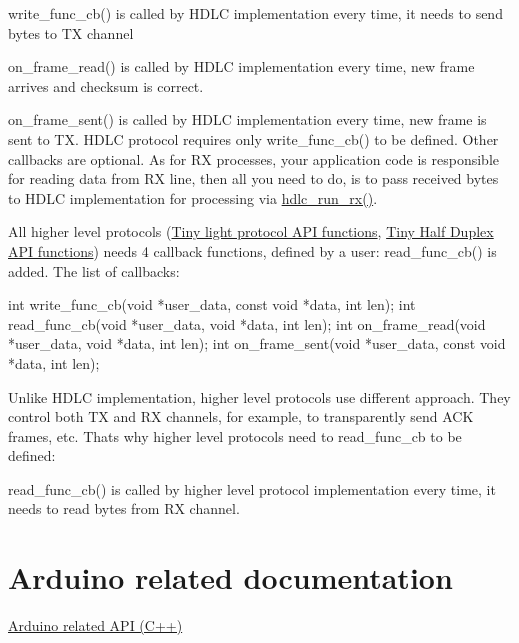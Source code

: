 \begin{DoxyItemize}
\item write\+\_\+func\+\_\+cb() is called by H\+D\+LC implementation every time, it needs to send bytes to TX channel
\item on\+\_\+frame\+\_\+read() is called by H\+D\+LC implementation every time, new frame arrives and checksum is correct.
\item on\+\_\+frame\+\_\+sent() is called by H\+D\+LC implementation every time, new frame is sent to TX. H\+D\+LC protocol requires only write\+\_\+func\+\_\+cb() to be defined. Other callbacks are optional. As for RX processes, your application code is responsible for reading data from RX line, then all you need to do, is to pass received bytes to H\+D\+LC implementation for processing via \hyperlink{group__HDLC__API_ga2d6e77ad3ac6ee53499afaa68cb69f72}{hdlc\+\_\+run\+\_\+rx()}.
\end{DoxyItemize}

All higher level protocols (\hyperlink{group__LIGHT__API}{Tiny light protocol A\+PI functions}, \hyperlink{group__HALF__DUPLEX__API}{Tiny Half Duplex A\+PI functions}) needs 4 callback functions, defined by a user\+: read\+\_\+func\+\_\+cb() is added. The list of callbacks\+:


\begin{DoxyCode}
\textcolor{keywordtype}{int} write\_func\_cb(\textcolor{keywordtype}{void} *user\_data, \textcolor{keyword}{const} \textcolor{keywordtype}{void} *data, \textcolor{keywordtype}{int} len);
\textcolor{keywordtype}{int} read\_func\_cb(\textcolor{keywordtype}{void} *user\_data, \textcolor{keywordtype}{void} *data, \textcolor{keywordtype}{int} len);
\textcolor{keywordtype}{int} on\_frame\_read(\textcolor{keywordtype}{void} *user\_data, \textcolor{keywordtype}{void} *data, \textcolor{keywordtype}{int} len);
\textcolor{keywordtype}{int} on\_frame\_sent(\textcolor{keywordtype}{void} *user\_data, \textcolor{keyword}{const} \textcolor{keywordtype}{void} *data, \textcolor{keywordtype}{int} len);
\end{DoxyCode}


Unlike H\+D\+LC implementation, higher level protocols use different approach. They control both TX and RX channels, for example, to transparently send A\+CK frames, etc. That\textquotesingle{}s why higher level protocols need to read\+\_\+func\+\_\+cb to be defined\+:


\begin{DoxyItemize}
\item read\+\_\+func\+\_\+cb() is called by higher level protocol implementation every time, it needs to read bytes from RX channel.
\end{DoxyItemize}\hypertarget{index_arduino_section}{}\section{Arduino related documentation}\label{index_arduino_section}
\hyperlink{arduino}{Arduino related A\+PI (C++)} 